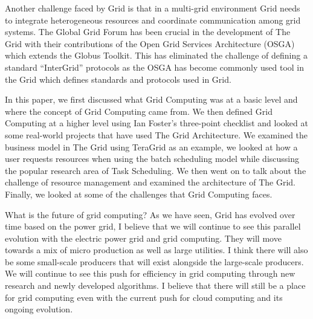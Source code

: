 \documentclass[10pt,journal,compsoc]{IEEEtran}
\begin{document}
\hspace{-0.5cm}Another challenge faced by Grid is that in a multi-grid environment Grid needs to integrate heterogeneous resources and coordinate communication among grid systems. \cite{GridOrCloud} The Global Grid Forum has been crucial in the development of The Grid with their contributions of the Open Grid Services Architecture (OSGA) which extends the Globus Toolkit. This has eliminated the challenge of defining a standard “InterGrid” protocols as the OSGA has become commonly used tool in the Grid which defines standards and protocols used in Grid. \cite{WhatGrid} \newline \newline \newline

\hspace{-0.5cm}In this paper, we first discussed what Grid Computing was at a basic level and where the concept of Grid Computing came from. We then defined Grid Computing at a higher level using Ian Foster's three-point checklist and looked at some real-world projects that have used The Grid Architecture. We examined the business model in The Grid using TeraGrid as an example, we looked at how a user requests resources when using the batch scheduling model while discussing the popular research area of Task Scheduling. We then went on to talk about the challenge of resource management and examined the architecture of The Grid. Finally, we looked at some of the challenges that Grid Computing faces. \newline 

\hspace{-0.5cm}What is the future of grid computing? As we have seen, Grid has evolved over time based on the power grid, I believe that we will continue to see this parallel evolution with the electric power grid and grid computing. They will move towards a mix of micro production as well as large utilities. I think there will also be some small-scale producers that will exist alongside the large-scale producers. We will continue to see this push for efficiency in grid computing through new research and newly developed algorithms. I believe that there will still be a place for grid computing even with the current push for cloud computing and its ongoing evolution.
\end{document}
